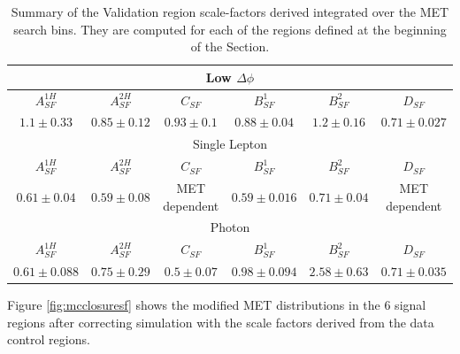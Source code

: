 \begin{table}
\centering
\caption{Summary of the Validation region scale-factors derived integrated over the MET search bins. They are computed for each of the regions defined at the beginning of the Section.}
\begin{tabular}{c|c|c|c|c|c}
\hline \hline
\multicolumn{6}{c}{Low $\Delta\phi$}\\
\hline \hline
$A^{1H}_{SF}$ & $A^{2H}_{SF}$ & $C_{SF}$ & $B^{1}_{SF}$ & $B^{2}_{SF}$ & $D_{SF}$  \\ \hline
   $1.1 \pm 0.33$ &$0.85 \pm 0.12$&  $0.93 \pm 0.1$ & $0.88 \pm 0.04$ & $1.2 \pm 0.16$  & $0.71 \pm 0.027$ \\ \hline
\hline \hline
\multicolumn{6}{c}{Single Lepton}\\
\hline \hline
$A^{1H}_{SF}$ & $A^{2H}_{SF}$ & $C_{SF}$ & $B^{1}_{SF}$ & $B^{2}_{SF}$ & $D_{SF}$  \\ \hline
   $0.61\pm 0.04$ & $0.59\pm0.08$ & MET dependent &  $0.59\pm 0.016$ & $0.71\pm 0.04$  & MET dependent\\ \hline
\hline \hline
\multicolumn{6}{c}{Photon}\\
\hline \hline
$A^{1H}_{SF}$ & $A^{2H}_{SF}$ & $C_{SF}$ & $B^{1}_{SF}$ & $B^{2}_{SF}$ & $D_{SF}$ \\ \hline
   $0.61 \pm 0.088$ & $0.75 \pm 0.29$ & $0.5 \pm 0.07$ & $0.98 \pm 0.094$ & $2.58 \pm 0.63$ & $0.71 \pm 0.035$\\ \hline
\end{tabular}
\label{tab:ScaleFactorVR}
\end{table}

Figure \ref{fig:mcclosuresf} shows the modified MET distributions in the 6 signal regions after correcting simulation with the scale factors derived from the data control regions.

